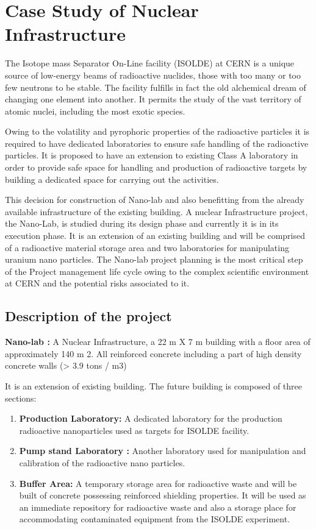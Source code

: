 \let\textcircled=\pgftextcircled
\chapter{Case Study of Nuclear Infrastructure}
\label{chap:chap5}
The Isotope mass Separator On-Line facility (ISOLDE) at CERN is a unique source of low-energy beams of radioactive nuclides, those with too many or too few neutrons to be stable. The facility fulfills in fact the old alchemical dream of changing one element into another. It permits the study of the vast territory of atomic nuclei, including the most exotic species. 

Owing to the volatility and pyrophoric properties of the radioactive particles it is required to have dedicated laboratories to ensure safe handling of the radioactive particles. It is proposed to have an extension to existing Class A laboratory in order to provide safe space for handling and production of radioactive targets by building a dedicated space for carrying out the activities.

This decision for construction of Nano-lab and also benefitting from the already available infrastructure of the existing building.  A nuclear Infrastructure project, the Nano-Lab, is studied during its design phase and currently it is in its execution phase. It is an extension of an existing building and will be comprised of a radioactive material storage area and two laboratories for manipulating uranium nano particles. The Nano-lab project planning is the most critical step of the Project management life cycle owing to the complex scientific environment at CERN and the potential risks associated to it. 

\section{Description of the project}

\textbf{Nano-lab :}  A Nuclear Infrastructure, a  22 m X 7 m building with a floor area of approximately 140 m 2. All reinforced concrete including a part of high density concrete walls (> 3.9 tons / m3)

It is an extension of existing building. The future building is composed of three sections:

\begin{enumerate}
	\item \textbf{Production Laboratory:} A dedicated laboratory for the production radioactive nanoparticles used as targets for ISOLDE facility.
	\item \textbf{Pump stand Laboratory :} Another laboratory  used for manipulation and calibration of the radioactive nano particles.
	\item \textbf{Buffer Area:} A temporary storage area for radioactive waste and will be built of concrete possessing reinforced shielding properties. It will be used as an immediate repository for radioactive waste and also a storage place for accommodating contaminated equipment from the ISOLDE experiment.
\end{enumerate}

